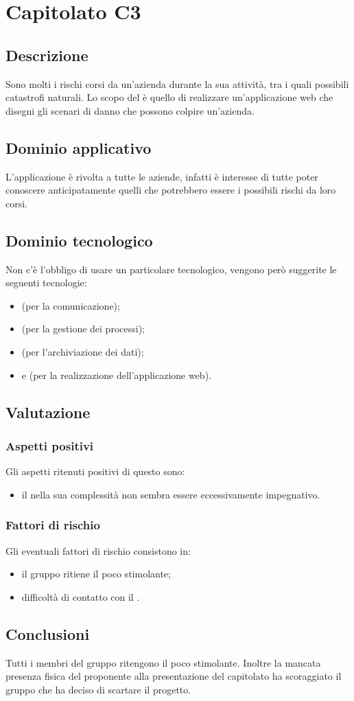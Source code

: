\section {Capitolato C3}
	\subsection {Descrizione}
		Sono molti i rischi corsi da un'azienda durante la sua attività, tra i quali possibili catastrofi naturali. Lo scopo del  è quello di realizzare un'applicazione web che disegni gli scenari di
		danno che possono colpire un'azienda.
	\subsection {Dominio applicativo}
		L'applicazione è rivolta a tutte le aziende, infatti è interesse di tutte poter conoscere anticipatamente quelli che potrebbero essere i possibili rischi da loro corsi.
	\subsection {Dominio tecnologico}
		Non c'è l'obbligo di usare un particolare  tecnologico, vengono però suggerite le seguenti tecnologie:
		\begin{itemize}
			\item \textbf{} (per la comunicazione);
			\item \textbf{} (per la gestione dei processi);
			\item \textbf{} (per l'archiviazione dei dati);
			\item \textbf{} e \textbf{} (per la realizzazione dell'applicazione web).
		\end{itemize}
	\subsection {Valutazione}
		\subsubsection {Aspetti positivi}
		Gli aspetti ritenuti positivi di questo  sono:
			\begin{itemize}
				\item il  nella sua complessità non sembra essere eccessivamente impegnativo.
			\end{itemize}
		\subsubsection {Fattori di rischio}
		Gli eventuali fattori di rischio consistono in:
			\begin{itemize}
				\item il gruppo ritiene il  poco stimolante;
				\item difficoltà di contatto con il .
			\end{itemize}
	\subsection {Conclusioni}
		Tutti i membri del gruppo ritengono il  poco stimolante. Inoltre la mancata presenza fisica del proponente alla presentazione del capitolato ha scoraggiato il gruppo che ha deciso di scartare il progetto.